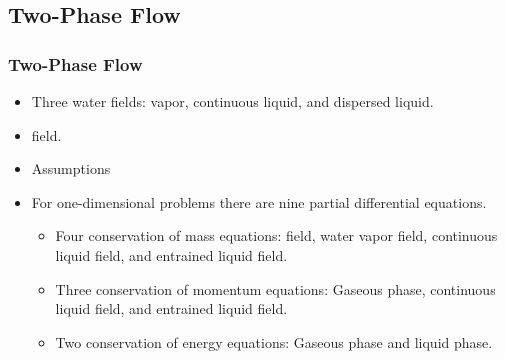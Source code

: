 \documentclass[compress,xcolor=table]{beamer}
\begin{document}
\subsection[Two-Phase Flow]{Two-Phase Flow}
\begin{frame}
\frametitle{Two-Phase Flow}

\begin{itemize}
\item{Three water fields: vapor, continuous liquid, and dispersed liquid.}
\item{\Ncg{} field.}
\item{Assumptions}
\item{For one-dimensional problems there are nine partial differential equations.
\begin{itemize}
\item{Four conservation of mass equations: \Ncg{} field, water vapor field, continuous liquid field, and entrained liquid field.}
\item{Three conservation of momentum equations: Gaseous phase, continuous liquid field, and entrained liquid field.}
\item{Two conservation of energy equations: Gaseous phase and liquid phase.}
\end{itemize}
}
\end{itemize}

\end{frame}
\end{document}
